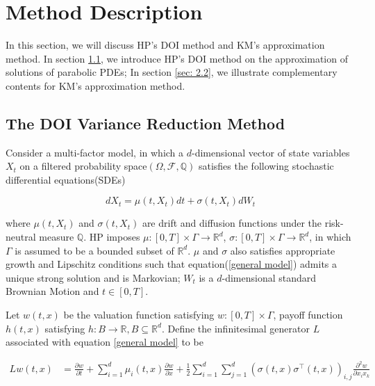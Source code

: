 \chapter{Method Description}\label{ch2}

In this section, we will discuss HP's DOI method and KM's approximation method. In section \ref{sec: 2.1}, we introduce HP's DOI method on the approximation of solutions of parabolic PDEs; In section \ref{sec: 2.2}, we illustrate complementary contents for KM's approximation method.

\section{The DOI Variance Reduction Method}
\label{sec: 2.1}

Consider a multi-factor model, in which a $d$-dimensional vector of state variables $X_t$ on a filtered probability space$(\Omega,\mathcal F, \mathbb Q)$ satisfies the following stochastic differential equations(SDEs)

\begin{equation}\label{general model}
    dX_t= \mu(t, X_t) dt + \sigma(t, X_t) dW_t
\end{equation}

\noindent where $\mu(t,X_t)$ and $\sigma(t, X_t)$ are drift and diffusion functions under the risk-neutral measure $\mathbb Q$. HP imposes $\mu: [0,T] \times \Gamma \rightarrow \mathbb R^d$, $\sigma: [0,T] \times \Gamma \rightarrow \mathbb R^d$, in which $\Gamma$ is assumed to be a bounded subset of $\mathbb R^d$. $\mu$ and $\sigma$ also satisfies appropriate growth and Lipschitz conditions such that equation(\ref{general model}) admits a unique strong solution and is Markovian; $W_t$ is a $d$-dimensional standard Brownian Motion and $t \in [0,T]$.

Let $w(t,x)$ be the valuation function satisfying $w: [0,T] \times \Gamma$, payoff function $h(t,x)$ satisfying $h: B \rightarrow \mathbb R, B \subseteq \mathbb R^d$. Define the infinitesimal generator $L$ associated with equation \eqref{general model} to be

\begin{equation}\label{general inf gen}
    \begin{aligned}
        L w(t, x)&=\frac{\partial w}{\partial t} + \sum_{i=1}^{d} \mu_i(t, x) \frac{\partial w}{\partial x}+\frac{1}{2} \sum_{i=1}^{d}\sum_{j=1}^{d} (\sigma(t,x) \sigma^{\intercal}(t,x))_{i,j} \frac{\partial^2 w}{\partial x_i x_k}
    \end{aligned}
\end{equation}

